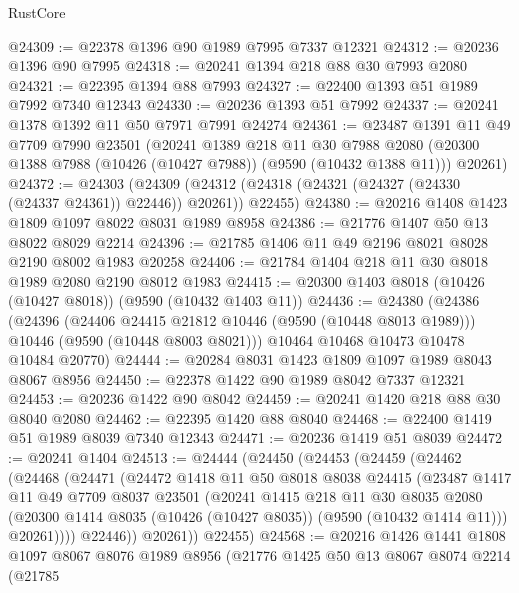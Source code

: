 \begin{lexlean}{RustCore}
\begin{coremodule}
@24309 := @22378 @1396 @90 @1989 @7995 @7337 @12321
@24312 := @20236 @1396 @90 @7995
@24318 := @20241 @1394 @218 @88 @30 @7993 @2080
@24321 := @22395 @1394 @88 @7993
@24327 := @22400 @1393 @51 @1989 @7992 @7340 @12343
@24330 := @20236 @1393 @51 @7992
@24337 := @20241 @1378 @1392 @11 @50 @7971 @7991 @24274
@24361 := @23487
    @1391
    @11
    @49
    @7709
    @7990
    @23501
    (@20241
      @1389
      @218
      @11
      @30
      @7988
      @2080
      (@20300 @1388 @7988 (@10426 (@10427 @7988)) (@9590 (@10432 @1388 @11)))
      @20261)
@24372 := @24303
    (@24309 (@24312 (@24318 (@24321 (@24327 (@24330 (@24337 @24361)) @22446)) @20261)) @22455)
@24380 := @20216 @1408 @1423 @1809 @1097 @8022 @8031 @1989 @8958
@24386 := @21776 @1407 @50 @13 @8022 @8029 @2214
@24396 := @21785 @1406 @11 @49 @2196 @8021 @8028 @2190 @8002 @1983 @20258
@24406 := @21784 @1404 @218 @11 @30 @8018 @1989 @2080 @2190 @8012 @1983
@24415 := @20300 @1403 @8018 (@10426 (@10427 @8018)) (@9590 (@10432 @1403 @11))
@24436 := @24380
    (@24386
      (@24396
        (@24406 @24415 @21812 @10446 (@9590 (@10448 @8013 @1989)))
        @10446
        (@9590 (@10448 @8003 @8021)))
      @10464
      @10468
      @10473
      @10478
      @10484
      @20770)
@24444 := @20284 @8031 @1423 @1809 @1097 @1989 @8043 @8067 @8956
@24450 := @22378 @1422 @90 @1989 @8042 @7337 @12321
@24453 := @20236 @1422 @90 @8042
@24459 := @20241 @1420 @218 @88 @30 @8040 @2080
@24462 := @22395 @1420 @88 @8040
@24468 := @22400 @1419 @51 @1989 @8039 @7340 @12343
@24471 := @20236 @1419 @51 @8039
@24472 := @20241 @1404
@24513 := @24444
    (@24450
      (@24453
        (@24459
          (@24462
            (@24468
              (@24471
                (@24472
                  @1418
                  @11
                  @50
                  @8018
                  @8038
                  @24415
                  (@23487
                    @1417
                    @11
                    @49
                    @7709
                    @8037
                    @23501
                    (@20241
                      @1415
                      @218
                      @11
                      @30
                      @8035
                      @2080
                      (@20300 @1414 @8035 (@10426 (@10427 @8035)) (@9590 (@10432 @1414 @11)))
                      @20261))))
              @22446))
          @20261))
      @22455)
@24568 := @20216
    @1426
    @1441
    @1808
    @1097
    @8067
    @8076
    @1989
    @8956
    (@21776
      @1425
      @50
      @13
      @8067
      @8074
      @2214
      (@21785

\end{coremodule}
\end{lexlean}
